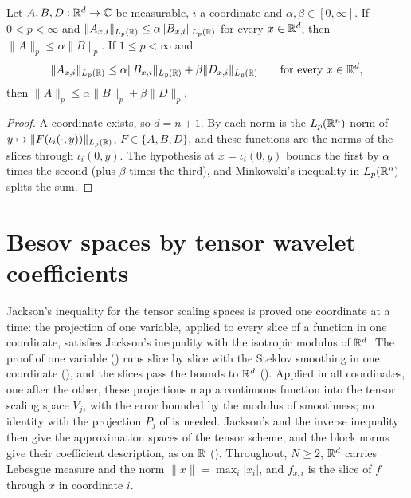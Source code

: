 \begin{lemma}
\label{lem:rd-slices-minkowski}
\leanok
Let $A, B, D : \mathbb{R}^d \to \mathbb{C}$ be measurable, $i$ a coordinate and $\alpha, \beta \in [0, \infty]$.
If $0 < p < \infty$ and $\|A_{x,i}\|_{L_p(\mathbb{R})} \leq \alpha \|B_{x,i}\|_{L_p(\mathbb{R})}$ for every
$x \in \mathbb{R}^d$, then $\|A\|_p \leq \alpha \|B\|_p$. If $1 \leq p < \infty$ and
\[
  \|A_{x,i}\|_{L_p(\mathbb{R})} \leq \alpha \|B_{x,i}\|_{L_p(\mathbb{R})} + \beta \|D_{x,i}\|_{L_p(\mathbb{R})}
  \qquad \text{for every } x \in \mathbb{R}^d ,
\]
then $\|A\|_p \leq \alpha \|B\|_p + \beta \|D\|_p$.
\end{lemma}

\begin{proof}
\leanok
{}
A coordinate exists, so $d = n + 1$. By  each norm is the $L_p(\mathbb{R}^n)$ norm
of $y \mapsto \|F(\iota_i(\cdot, y))\|_{L_p(\mathbb{R})}$, $F \in \{A, B, D\}$, and these functions are
the norms of the slices through $\iota_i(0, y)$. The hypothesis at $x = \iota_i(0, y)$ bounds the
first by $\alpha$ times the second (plus $\beta$ times the third), and Minkowski's inequality in
$L_p(\mathbb{R}^n)$ splits the sum.
\end{proof}

\section{Besov spaces by tensor wavelet coefficients}
\label{sec:daub-rd-besov}

Jackson's inequality for the tensor scaling spaces is proved one coordinate at a time: the
projection of one variable, applied to every slice of a function in one coordinate, satisfies
Jackson's inequality with the isotropic modulus of $\mathbb{R}^d$. The proof of one variable
() runs slice by slice with the Steklov smoothing in one
coordinate (), and the slices pass the bounds to $\mathbb{R}^d$
(). Applied in all coordinates, one after the other, these
projections map a continuous function into the tensor scaling space $V_j$, with the error bounded
by the modulus of smoothness; no identity with the projection $P_j$ of  is
needed. Jackson's and the inverse inequality then give the approximation spaces of the tensor
scheme, and the block norms give their coefficient description, as on $\mathbb{R}$
(). Throughout, $N \geq 2$, $\mathbb{R}^d$ carries Lebesgue measure and the
norm $\|x\| = \max_i |x_i|$, and $f_{x,i}$ is the slice of $f$ through $x$ in coordinate $i$.

